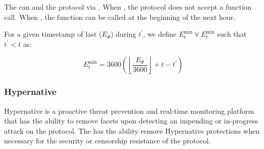 \documentclass[class=article, crop=false]{standalone}
\begin{document}
The  can  and  the protocol via . When , the protocol does not accept a  function call. When , the  function can be called at the beginning of the next hour.

For a given timestamp of last  ($E_{\Psi}$) during  $t^{'}$, we define $E_{t}^{\text{min}}\ \forall\ E_{t}^{\text{min}}$ such that $t^{'} < t$ as:

    $$
        E_{t}^{\text{min}} = 3600{\left
            ({\left\lfloor
                \frac{E_{\Psi}}
                    {3600}\right\rfloor} + t - t^{'}\right)}
    $$


\subsubsection{Hypernative}

Hypernative is a proactive threat prevention and real-time monitoring platform that has the ability to remove facets upon detecting an impending or in-progress attack on the protocol. The  has the ability remove Hypernative protections when necessary for the security or censorship resistance of the protocol.
\end{document}

